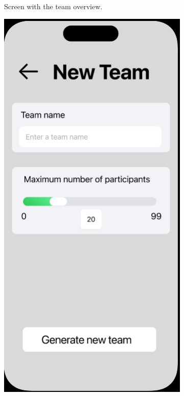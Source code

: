 \documentclass[11pt]{article}
\begin{document}
\begin{figure}[h!]
\begin{subfigure}[b]{0.3\textwidth}
         \caption{Screen with the team overview. }
         \label{fig:teamoverview}
     \end{subfigure}
     \hfill
     \begin{subfigure}[b]{0.3\textwidth}
         \centering
         \includegraphics[width=\textwidth]{figures/new team.PNG}

\end{subfigure}
\end{figure}
\end{document}
